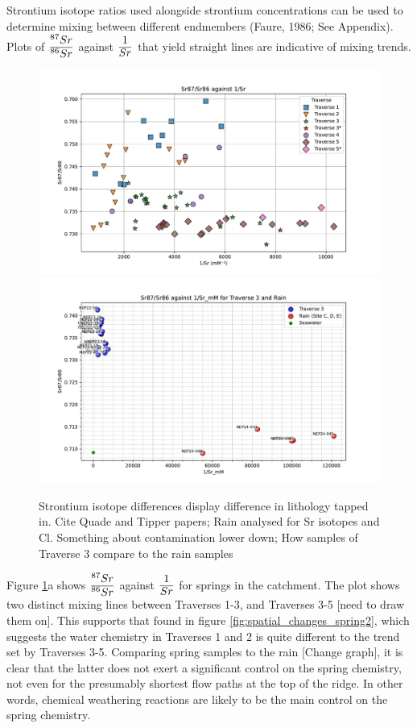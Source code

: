 Strontium isotope ratios used alongside strontium concentrations can be used to determine mixing between different endmembers (Faure, 1986; See Appendix). Plots of $\ddfrac{^{87}Sr}{^{86}Sr}$ against $\ddfrac{1}{Sr}$ that yield straight lines are indicative of mixing trends. 

\begin{figure}[p]
    \centering
    \includegraphics[width=\textwidth]{Sr87_Sr86_1_Sr.pdf}
    \includegraphics[width=\textwidth]{Sr87_Sr86_1Sr_Rain.pdf}
    \caption{Strontium isotope differences display difference in lithology tapped in. Cite Quade and Tipper papers; Rain analysed for Sr isotopes and Cl. Something about contamination lower down; How samples of Traverse 3 compare to the rain samples}
    \label{fig:discussion3}
\end{figure}

\FloatBarrier

Figure \ref{fig:discussion3}a shows $\ddfrac{^{87}Sr}{^{86}Sr}$ against $\ddfrac{1}{Sr}$ for springs in the catchment. The plot shows two distinct mixing lines between Traverses 1-3, and Traverses 3-5 [need to draw them on]. This supports that found in figure \ref{fig:spatial_changes_spring2}, which suggests the water chemistry in Traverses 1 and 2 is quite different to the trend set by Traverses 3-5. Comparing spring samples to the rain [Change graph], it is clear that the latter does not exert a significant control on the spring chemistry, not even for the presumably shortest flow paths at the top of the ridge. In other words, chemical weathering reactions are likely to be the main control on the spring chemistry.


